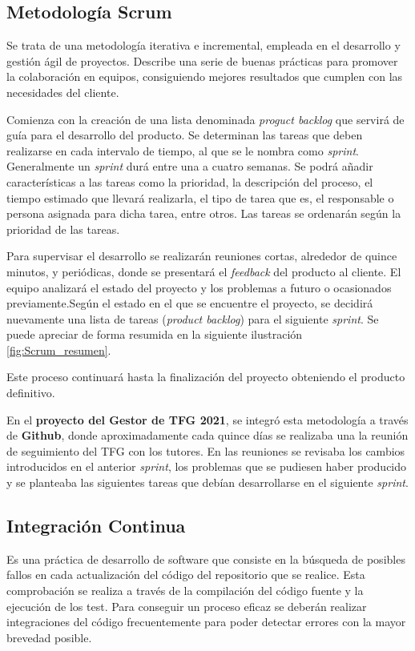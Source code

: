 \subsection{Metodología Scrum}
Se trata de una metodología iterativa e incremental, empleada en el desarrollo y gestión ágil de proyectos. Describe una serie de buenas prácticas para promover la colaboración en equipos, consiguiendo mejores resultados que cumplen con las necesidades del cliente.

Comienza con la creación de una lista denominada \emph{proguct backlog} que servirá de guía para el desarrollo del producto. Se determinan las tareas que deben realizarse en cada intervalo de tiempo, al que se le nombra como \emph{sprint}. Generalmente un \emph{sprint} durá entre una a cuatro semanas. Se podrá añadir características a las tareas como la prioridad, la descripción del proceso, el tiempo estimado que llevará realizarla, el tipo de tarea que es, el responsable o persona asignada para dicha tarea, entre otros. Las tareas se ordenarán según la prioridad de las tareas.

Para supervisar el desarrollo se realizarán reuniones cortas, alrededor de quince minutos, y periódicas, donde se presentará el \emph{feedback} del producto al cliente. El equipo analizará el estado del proyecto y los problemas a futuro o ocasionados previamente.Según el estado en el que se encuentre el proyecto, se decidirá nuevamente una lista de tareas (\emph{product backlog}) para el siguiente \emph{sprint}. Se puede apreciar de forma resumida en la siguiente ilustración \ref{fig:Scrum_resumen}.


Este proceso continuará hasta la finalización del proyecto obteniendo el producto definitivo.

En el \textbf{proyecto del Gestor de TFG 2021}, se integró esta metodología a través de \textbf{Github}, donde aproximadamente cada quince días se realizaba una la reunión de seguimiento del TFG con los tutores. En las reuniones se revisaba los cambios introducidos en el anterior \emph{sprint}, los problemas que se pudiesen haber producido y se planteaba las siguientes tareas que debían desarrollarse en el siguiente \emph{sprint}.

\subsection{Integración Continua}
Es una práctica de desarrollo de software que consiste en la búsqueda de posibles fallos en cada actualización del código del repositorio que se realice. Esta comprobación se realiza a través de la compilación del código fuente y la ejecución de los test. Para conseguir un proceso eficaz se deberán realizar integraciones del código frecuentemente para poder detectar errores con la mayor brevedad posible.

